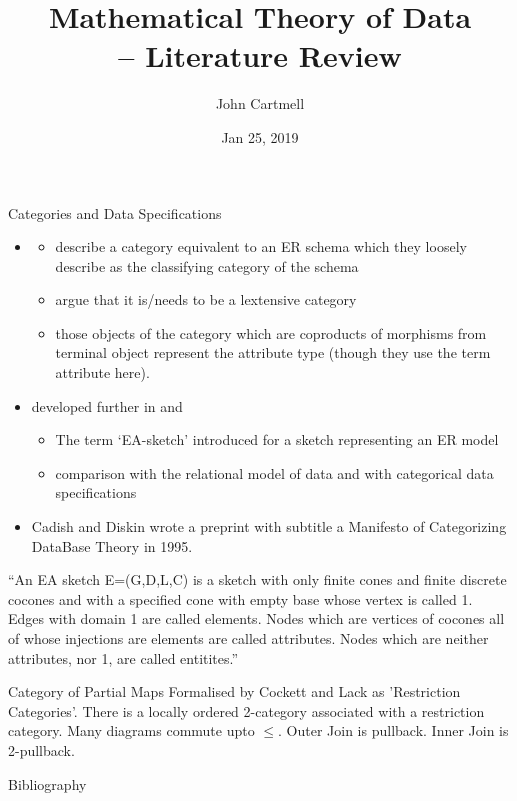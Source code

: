 \documentclass[xcolor=pst,dvips]{beamer}   %
\title[John Cartmell]{Mathematical Theory of Data \\ -- Literature Review}
\author{John Cartmell}
\institute{ad otium}
\date{Jan 25, 2019}
\begin{document}
\begin{frame}
\titlepage
\end{frame}


\begin{frame}{Categories and Data Specifications}
\begin{itemize} \footnotesize
\item  \cite{Johnson93} 
\begin{itemize} 
\item describe a category equivalent to an ER schema which they loosely describe as the classifying category of the schema
\item argue that it is/needs to be a lextensive category
\item those objects of the category which are coproducts of morphisms from terminal object represent the attribute type (though they use the term attribute here).
\end{itemize}
\pause \item developed further in \cite{johnson2002REL} and \cite{Johnson2002ERA}
\begin{itemize} \footnotesize
\pause \item The term `EA-sketch' introduced for a sketch representing an ER model 
\pause \item comparison with the relational model of data and with categorical data specifications\cite{piessens1995}
\end{itemize}
\pause \item Cadish and Diskin wrote a preprint with subtitle a Manifesto of Categorizing DataBase Theory in 1995.
\end{itemize}
\end{frame}

\begin{frame}{\cite{Johnson2002ERA}}

``An EA sketch E=(G,D,L,C) is a sketch with only finite cones and finite discrete cocones and with a 
specified cone with empty base whose vertex is called 1. Edges with domain 1 are called elements. 
Nodes which are vertices of cocones all of whose injections are elements are called attributes. 
Nodes which are neither attributes, nor 1, are called entitites.''
\end{frame}



\begin{frame}{Category of Partial Maps}
Formalised by Cockett and Lack as 'Restriction Categories'.
There is a locally ordered 2-category associated with a restriction category.
Many diagrams commute upto $\leq$.
Outer Join is pullback.
Inner Join is 2-pullback.
\end{frame}

\begin{frame}{Bibliography}
{\tiny

}
\end{frame}
\end{document}
